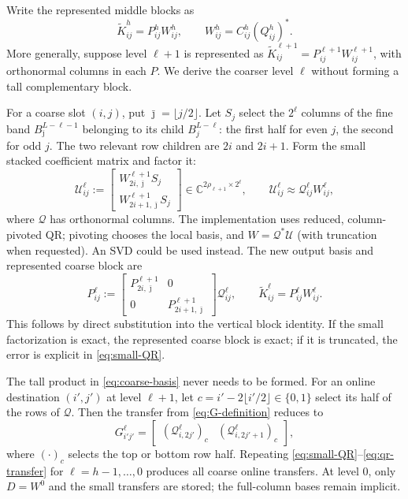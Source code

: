 \documentclass[11pt]{article}
\newcommand{\C}{\mathbb{C}}
\newcommand{\jd}{\bar\jmath}
\begin{document}
Write the represented middle blocks as
\[
 \widetilde K_{ij}^{h}=P_{ij}^{h}W_{ij}^{h},
 \qquad W_{ij}^{h}=C_{ij}^{h}(Q_{ij}^{h})^*.
\]
More generally, suppose level $\ell+1$ is represented as $\widetilde K_{ij}^{\ell+1}=P_{ij}^{\ell+1}W_{ij}^{\ell+1}$, with orthonormal columns in each $P$.  We derive the coarser level $\ell$ without forming a tall complementary block.

For a coarse slot $(i,j)$, put $\jd=\lfloor j/2\rfloor$.  Let $S_j$ select the $2^\ell$ columns of the fine band $B_{\jd}^{L-\ell-1}$ belonging to its child $B_j^{L-\ell}$: the first half for even $j$, the second for odd $j$.  The two relevant row children are $2i$ and $2i+1$.  Form the small stacked coefficient matrix and factor it:
\[
 \mathcal U_{ij}^{\ell}:=
 \begin{bmatrix}
 W_{2i,\jd}^{\ell+1}S_j\\[2pt]
 W_{2i+1,\jd}^{\ell+1}S_j
 \end{bmatrix}
 \in\C^{2\rho_{\ell+1}\times2^\ell},
 \qquad
 \mathcal U_{ij}^{\ell}\approx\mathcal Q_{ij}^{\ell}W_{ij}^{\ell},
 \tag{15}\label{eq:small-QR}
\]
where $\mathcal Q$ has orthonormal columns.  The implementation uses reduced, column-pivoted QR; pivoting chooses the local basis, and $W=\mathcal Q^*\mathcal U$ (with truncation when requested).  An SVD could be used instead.  The new output basis and represented coarse block are
\[
 P_{ij}^{\ell}:=
 \begin{bmatrix}P_{2i,\jd}^{\ell+1}&0\\0&P_{2i+1,\jd}^{\ell+1}\end{bmatrix}
 \mathcal Q_{ij}^{\ell},
 \qquad
 \widetilde K_{ij}^{\ell}=P_{ij}^{\ell}W_{ij}^{\ell}.
 \tag{16}\label{eq:coarse-basis}
\]
This follows by direct substitution into the vertical block identity.  If the small factorization is exact, the represented coarse block is exact; if it is truncated, the error is explicit in \eqref{eq:small-QR}.

The tall product in \eqref{eq:coarse-basis} never needs to be formed.  For an online destination $(i',j')$ at level $\ell+1$, let $c=i'-2\lfloor i'/2\rfloor\in\{0,1\}$ select its half of the rows of $\mathcal Q$.  Then the transfer from \eqref{eq:G-definition} reduces to
\[
 \boxed{\quad G_{i'j'}^{\ell}=
 \begin{bmatrix}
 (\mathcal Q_{i,2j'}^{\ell})_c&(\mathcal Q_{i,2j'+1}^{\ell})_c
 \end{bmatrix},\quad}
 \tag{17}\label{eq:qr-transfer}
\]
where $(\cdot)_c$ selects the top or bottom row half.  Repeating \eqref{eq:small-QR}--\eqref{eq:qr-transfer} for $\ell=h-1,\dots,0$ produces all coarse online transfers.  At level $0$, only $D=W^0$ and the small transfers are stored; the full-column bases remain implicit.
\end{document}
